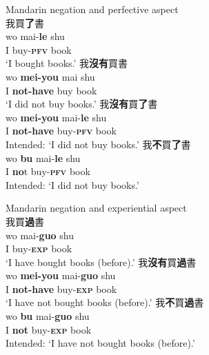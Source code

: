 \documentclass[output=paper]{langscibook}
\begin{document}
\ea Mandarin negation and perfective aspect \label{ex:lam2}\\
  \ea 我買\textbf{了}書 \label{ex:lam2a}\\
    \gll wo	mai-\textbf{le} shu \\
    I buy-\textbf{\textsc{pfv}} book\\
    \glt `I bought books.'
  \ex 我\textbf{沒有}買書 \label{ex:lam2b}\\
    \gll wo	\textbf{mei-you} mai shu \\
    I \textbf{not-have} buy book\\
    \glt `I did not buy books.'
  \ex 我\textbf{沒有}買\textbf{了}書 \label{ex:lam2c}\\
  	\gll *wo	 \textbf{mei-you} mai-\textbf{le} shu\\
  	I \textbf{not-have} buy-\textbf{\textsc{pfv}} book\\
  	\glt Intended: `I did not buy books.'
  \ex 我\textbf{不}買\textbf{了}書 \label{ex:lam2d}\\
  	\gll *wo	 \textbf{bu} mai-\textbf{le} shu \\
  	I \textbf{no}t buy-\textbf{\textsc{pfv}} book\\
  	\glt Intended: `I did not buy books.'
\z \z


\ea Mandarin negation and experiential aspect \label{ex:lam3}\\
  \ea 我買\textbf{過}書 \label{ex:lam3a}\\
    \gll wo	mai-\textbf{guo} shu\\
	I buy-\textbf{\textsc{exp}} book\\
	\glt `I have bought books (before).'
  \ex 我\textbf{沒有}買\textbf{過}書 \label{ex:lam3b}\\
    \gll wo	\textbf{mei-you} mai-\textbf{guo} shu\\
	I \textbf{not-have} buy-\textbf{\textsc{exp}} book\\
	\glt `I have not bought books (before).'
  \ex 我\textbf{不}買\textbf{過}書 \label{ex:lam3c}\\
  \gll *wo \textbf{bu} mai-\textbf{guo} shu \\
  	I \textbf{not} buy-\textbf{\textsc{exp}} book\\
  	\glt Intended: `I have not bought books (before).'
\z \z
\end{document}
